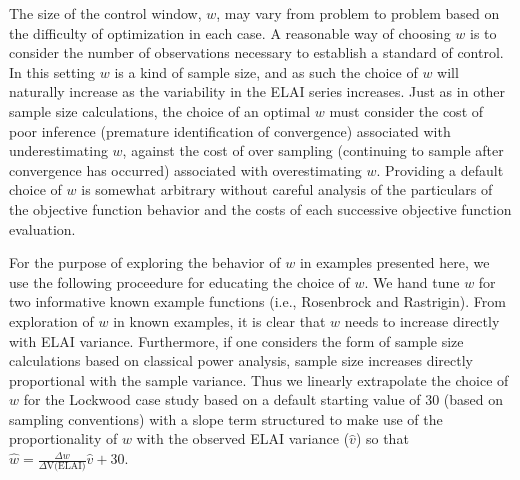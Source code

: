 \documentclass{article}
\begin{document}
%
The size of the control window, $w$, may vary from problem to problem based on 
the difficulty of optimization in each case. A reasonable way of choosing $w$ 
is to consider the number of observations necessary to establish a standard of 
control. In this setting $w$ is a kind of sample size, and as such the 
choice of $w$ will naturally increase as the variability in the ELAI series 
increases. Just as in other sample size calculations, the choice of an optimal 
$w$ must consider the cost of poor inference (premature identification of 
convergence) associated with underestimating $w$, against the cost of over 
sampling (continuing to sample after convergence has occurred) associated with 
overestimating $w$. Providing a default choice of $w$ is somewhat arbitrary 
without careful analysis of the particulars of the objective function behavior 
and the costs of each successive objective function evaluation. 

%
For the purpose of exploring the behavior of $w$ in examples presented here, 
we use the following proceedure for educating the choice of $w$. We hand tune 
$w$ for two informative known example functions (i.e., Rosenbrock and 
Rastrigin). From exploration of $w$ in known examples, it is clear that $w$ 
needs to increase directly with ELAI variance. Furthermore, if one considers the form 
of sample size calculations based on classical power analysis, sample size 
increases directly proportional with the sample variance. Thus we linearly 
extrapolate the choice of $w$ for the Lockwood case study based on a default 
starting value of 30 (based on sampling conventions) with a slope term 
structured to make use of the proportionality of $w$ with the observed ELAI 
variance ($\hat v$) so that \mbox{$\hat w=\frac{\Delta w}{\Delta \text{V(ELAI)}}\hat v+30$.} %

% 
% 
% 
\end{document}
